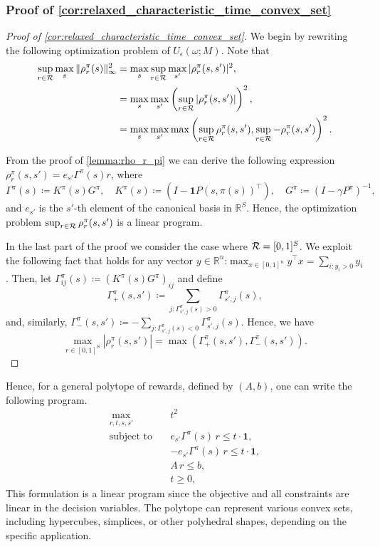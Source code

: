 \subsubsection{Proof of \cref{cor:relaxed_characteristic_time_convex_set}}\label{app:cor:relaxed_characteristic_time_convex_set}
\begin{proof}[Proof of \cref{cor:relaxed_characteristic_time_convex_set}]
We begin by rewriting the following optimization problem of $U_\epsilon(\omega;M)$. Note that 
\begin{align*} \sup_{r\in {\cal R}} \max_{s}  \|\rho_r^\pi(s)\|_\infty^2 &= \max_{s}  \sup_{r\in {\cal R}}  \max_{s'}|\rho_r^\pi(s,s')|^2,\\
&= \max_{s}    \max_{s'} \left(\sup_{r\in {\cal R}}|\rho_r^\pi(s,s')|\right)^2,\\
&= \max_{s}    \max_{s'} \max\left(\sup_{r\in {\cal R}}\rho_r^\pi(s,s'), \sup_{r\in {\cal R}}-\rho_r^\pi(s,s')\right)^2.
\end{align*}


From the proof of \cref{lemma:rho_r_pi} we can derive the following expression 
 $\rho_r^\pi(s,s')= e_{s'}\Gamma^\pi(s) r$, where \[
\Gamma^\pi(s)\coloneqq K^\pi(s)G^\pi,\quad K^\pi(s)\coloneqq(I-\mathbf{1}P(s,\pi(s))^\top),\quad G^\pi\coloneqq(I-\gamma P^\pi)^{-1},\]
and $e_{s'}$ is the $s'$-th element of the canonical basis in $\mathbb{R}^S$. Hence, the optimization problem $\sup_{r\in {\cal R}} \rho_r^\pi(s,s')$ is a linear program.


In the last part of the proof we consider the case where ${\cal R}=[0,1]^S$. We exploit the following fact that holds for any vector $y \in \mathbb{R}^n$:$\max_{x\in [0,1]^n} y^\top x = \sum_{i: y_i>0} y_i$.  
Then, let $\Gamma_{ij}^\pi(s)\coloneqq \left(K^\pi(s)G^\pi\right)_{ij}$  and  define 
\[
\Gamma_+^\pi(s,s') \coloneqq \sum_{j: \Gamma_{s',j}^\pi(s)>0} \Gamma_{s',j}^\pi(s),
\]
and, similarly,  $\Gamma_-^\pi(s,s') \coloneqq -\sum_{j: \Gamma_{s',j}^\pi(s)<0} \Gamma_{s',j}^\pi(s)$.
 Hence, we have
 \[
 \max_{r\in [0,1]^S}|\rho_r^\pi(s,s')| = \max\left( \Gamma_+^\pi(s,s'), \Gamma_-^\pi(s,s') \right).
 \]
\end{proof}


Hence, for a general polytope of rewards, defined by $(A,b)$, one can write the following program.
\begin{equation}\label{convex_program_polytope}
\begin{aligned}
    \max_{r, t,s,s'} \quad & t^2 \\
    \text{subject to} \quad & e_{s'}\Gamma^\pi(s) \, r \leq t \cdot \mathbf{1}, \\
    & -e_{s'}\Gamma^\pi(s) \, r \leq t \cdot \mathbf{1}, \\
    & A \, r \leq b, \\
    & t \geq 0,
\end{aligned}
\end{equation}
This formulation is a linear program since the objective and all constraints are linear in the decision variables. The polytope can represent various convex sets, including hypercubes, simplices, or other polyhedral shapes, depending on the specific application.


